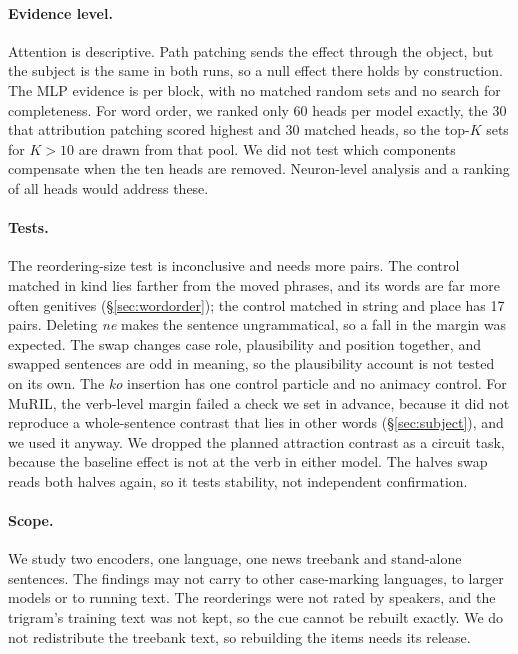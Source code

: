 \documentclass[11pt]{article}
\begin{document}
\paragraph{Evidence level.}
Attention is descriptive.
Path patching sends the effect through the object, but the subject is the same in both runs, so a null effect there holds by construction.
The MLP evidence is per block, with no matched random sets and no search for completeness.
For word order, we ranked only 60 heads per model exactly, the 30 that attribution patching scored highest and 30 matched heads, so the top-$K$ sets for $K>10$ are drawn from that pool.
We did not test which components compensate when the ten heads are removed.
Neuron-level analysis and a ranking of all heads would address these.

\paragraph{Tests.}
The reordering-size test is inconclusive and needs more pairs.
The control matched in kind lies farther from the moved phrases, and its words are far more often genitives (\S\ref{sec:wordorder}); the control matched in string and place has 17 pairs.
Deleting \emph{ne} makes the sentence ungrammatical, so a fall in the margin was expected.
The swap changes case role, plausibility and position together, and swapped sentences are odd in meaning, so the plausibility account is not tested on its own.
The \emph{ko} insertion has one control particle and no animacy control.
For MuRIL, the verb-level margin failed a check we set in advance, because it did not reproduce a whole-sentence contrast that lies in other words (\S\ref{sec:subject}), and we used it anyway.
We dropped the planned attraction contrast as a circuit task, because the baseline effect is not at the verb in either model.
The halves swap reads both halves again, so it tests stability, not independent confirmation.

\paragraph{Scope.}
We study two encoders, one language, one news treebank and stand-alone sentences.
The findings may not carry to other case-marking languages, to larger models or to running text.
The reorderings were not rated by speakers, and the trigram's training text was not kept, so the cue cannot be rebuilt exactly.
We do not redistribute the treebank text, so rebuilding the items needs its release.
\end{document}
